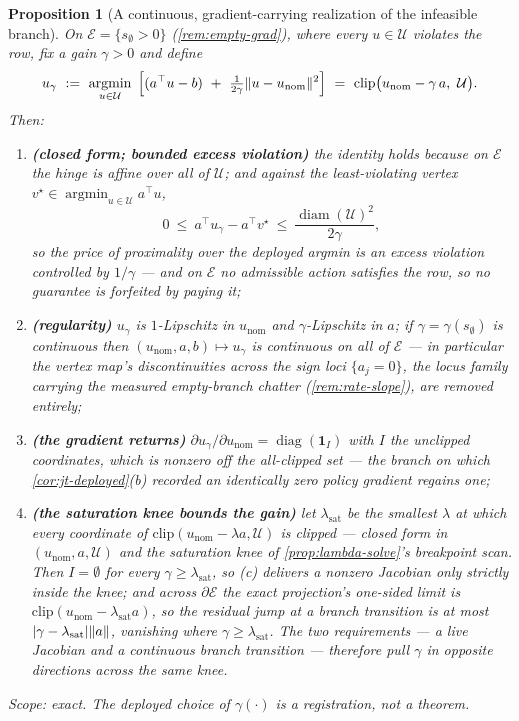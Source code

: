 \documentclass[11pt]{article}
\theoremstyle{plain}
\newtheorem{proposition}[theorem]{Proposition}
\theoremstyle{definition}
\theoremstyle{remark}
\DeclarePairedDelimiter{\norm}{\lVert}{\rVert}
\DeclarePairedDelimiter{\abs}{\lvert}{\rvert}
\newcommand{\calU}{\mathcal{U}}
\newcommand{\eqdef}{:=}
\begin{document}
\begin{proposition}[A continuous, gradient-carrying realization of the infeasible branch]\label{prop:empty-prox}
On $\mathcal E=\{s_\emptyset>0\}$ (\cref{rem:empty-grad}), where every $u\in\calU$ violates the
row, fix a gain $\gamma>0$ and define
\[
  u_\gamma\ \eqdef\ \operatorname*{argmin}_{u\in\calU}\;
  \Big[(a^\top u-b)\ +\ \tfrac{1}{2\gamma}\norm{u-u_{\mathrm{nom}}}^2\Big]
  \ =\ \mathrm{clip}\big(u_{\mathrm{nom}}-\gamma\,a,\ \calU\big).
\]
Then:
\begin{enumerate}[label=(\alph*)]
  \item \textbf{(closed form; bounded excess violation)} the identity holds because on
  $\mathcal E$ the hinge is affine over all of $\calU$; and against the least-violating vertex
  $v^\star\in\operatorname{argmin}_{u\in\calU}a^\top u$,
  \[
    0\ \le\ a^\top u_\gamma-a^\top v^\star\ \le\ \frac{\operatorname{diam}(\calU)^2}{2\gamma},
  \]
  so the price of proximality over the deployed argmin is an excess violation controlled by
  $1/\gamma$ --- and on $\mathcal E$ no admissible action satisfies the row, so no guarantee is
  forfeited by paying it;
  \item \textbf{(regularity)} $u_\gamma$ is $1$-Lipschitz in $u_{\mathrm{nom}}$ and
  $\gamma$-Lipschitz in $a$; if $\gamma=\gamma(s_\emptyset)$ is continuous then
  $(u_{\mathrm{nom}},a,b)\mapsto u_\gamma$ is continuous on all of $\mathcal E$ --- in
  particular the vertex map's discontinuities across the sign loci $\{a_j=0\}$, the locus
  family carrying the measured empty-branch chatter (\cref{rem:rate-slope}), are removed
  entirely;
  \item \textbf{(the gradient returns)} $\partial u_\gamma/\partial u_{\mathrm{nom}}
  =\operatorname{diag}(\mathbf 1_I)$ with $I$ the unclipped coordinates, which is nonzero off
  the all-clipped set --- the branch on which \cref{cor:jt-deployed}(b) recorded an identically
  zero policy gradient regains one;
  \item \textbf{(the saturation knee bounds the gain)} let $\lambda_{\mathrm{sat}}$ be the
  smallest $\lambda$ at which every coordinate of $\mathrm{clip}(u_{\mathrm{nom}}-\lambda a,\calU)$
  is clipped --- closed form in $(u_{\mathrm{nom}},a,\calU)$ and the saturation knee of
  \cref{prop:lambda-solve}'s breakpoint scan. Then $I=\emptyset$ for every
  $\gamma\ge\lambda_{\mathrm{sat}}$, so (c) delivers a nonzero Jacobian \emph{only strictly
  inside the knee}; and across $\partial\mathcal E$ the exact projection's one-sided limit is
  $\mathrm{clip}(u_{\mathrm{nom}}-\lambda_{\mathrm{sat}}a)$, so the residual jump at a branch
  transition is at most $\abs{\gamma-\lambda_{\mathrm{sat}}}\norm{a}$, vanishing where
  $\gamma\ge\lambda_{\mathrm{sat}}$. The two requirements --- a live Jacobian and a continuous
  branch transition --- therefore pull $\gamma$ in opposite directions across the same knee.
\end{enumerate}
Scope: exact. The deployed choice of $\gamma(\cdot)$ is a registration, not a theorem.
\end{proposition}
\end{document}
